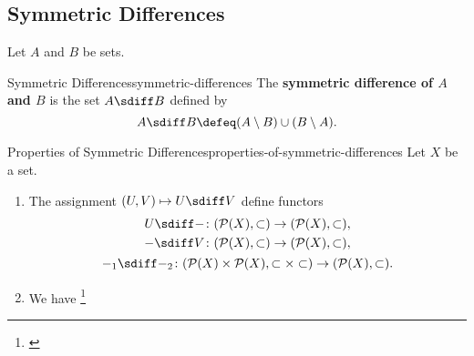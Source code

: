 \subsection{Symmetric Differences}\label{subsection-symmetric-differences}
Let $A$ and $B$ be sets.%
\begin{definition}{Symmetric Differences}{symmetric-differences}%
    The \textbf{symmetric difference of $A$ and $B$} is the set $A\sdiff B$ defined by%
    \[
        A\sdiff B
        \defeq
        (A\setminus B)%
        \cup%
        (B\setminus A).%
    \]%
\end{definition}
\begin{proposition}{Properties of Symmetric Differences}{properties-of-symmetric-differences}%
    Let $X$ be a set.
    \begin{enumerate}
        \item\label{properties-of-symmetric-differences-lack-of-functoriality}The assignment $(U,V)\mapsto U\sdiff V$  define functors
            \begin{gather*}
                \begin{aligned}
                    U\sdiff-    &\colon (\mathcal{P}(X),\subset)\to(\mathcal{P}(X),\subset),\\%
                    -\sdiff V   &\colon (\mathcal{P}(X),\subset)\to(\mathcal{P}(X),\subset),\\%
                \end{aligned}\\
                -_{1}\sdiff-_{2} \colon (\mathcal{P}(X)\times\mathcal{P}(X),\subset\times\subset)\to(\mathcal{P}(X),\subset).%
            \end{gather*}
        \item\label{properties-of-symmetric-differences-via-unions-and-intersections}We have%
            \footnote{%
                \begin{webcompile}
                    \hspace{0.5em}\scalebox{1.5}{$\mathbin{=}$}\hspace{0.5em}%

\end{webcompile}}
\end{enumerate}
\end{proposition}
